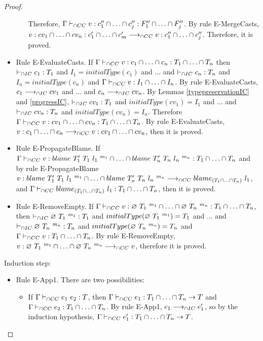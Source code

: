 \documentclass[a4paper]{article}
\begin{document}
\begin{proof}
\begin{itemize}
\begin{itemize}
        Therefore, $\Gamma \vdash_{\cap CC} v : c_1'' \cap \ldots \cap c_j'' : F_1'' \cap \ldots \cap F_j''$.
        By rule E-MergeCasts, $v : cv_1 \cap \ldots \cap cv_n : c_1' \cap \ldots \cap c_m' \longrightarrow_{\cap CC} v : c_1'' \cap \ldots \cap c_j''$.
        Therefore, it is proved.
    \end{itemize}
    \item Rule E-EvaluateCasts.
    If $\Gamma \vdash_{\cap CC} v : c_1 \cap \ldots \cap c_n : T_1 \cap \ldots \cap T_n$ then $\vdash_{\cap IC} c_1 : T_1$ and $I_1 = initialType(c_1)$ and ... and $\vdash_{\cap IC} c_n : T_n$ and $I_n = initialType(c_n)$ and $\Gamma \vdash_{\cap CC} v : I_1 \cap \ldots \cap I_n$.
    By rule E-EvaluateCasts, $c_1 \longrightarrow_{\cap IC} cv_1$ and ... and $c_n \longrightarrow_{\cap IC} cv_n$.
    By Lemmas \ref{typepreservationIC} and \ref{progressIC}, $\vdash_{\cap IC} cv_1 : T_1$ and $initialType(cv_1) = I_1$ and ... and $\vdash_{\cap IC} cv_n : T_n$ and $initialType(cv_n) = I_n$.
    Therefore $\Gamma \vdash_{\cap CC} v : cv_1 \cap \ldots \cap cv_n : T_1 \cap \ldots \cap T_n$.
    By rule E-EvaluateCasts, $v : c_1 \cap \ldots \cap c_n \longrightarrow_{\cap CC} v : cv_1 \cap \ldots \cap cv_n$, then it is proved.
    \item Rule E-PropagateBlame.
    If $\Gamma \vdash_{\cap CC} v : blame\ T_1'\ T_1\ l_1\ ^{m_1} \cap \ldots \cap blame\ T_n'\ T_n\ l_n\ ^{m_n} : T_1 \cap \ldots \cap T_n$ and by rule E-PropagateBlame $v : blame\ T_1'\ T_1\ l_1\ ^{m_1} \cap \ldots \cap blame\ T_n'\ T_n\ l_n\ ^{m_n} \longrightarrow_{\cap CC} blame_{(T_1 \cap \ldots \cap T_n)}\ l_1$, and $\Gamma \vdash_{\cap CC} blame_{(T_1 \cap \ldots \cap T_n)}\ l_1 : T_1 \cap \ldots \cap T_n$, then it is proved.
    \item Rule E-RemoveEmpty.
    If $\Gamma \vdash_{\cap CC} v : \varnothing\ T_1\ ^{m_1} \cap \ldots \cap \varnothing\ T_n\ ^{m_n} : T_1 \cap \ldots \cap T_n$, then $\vdash_{\cap IC} \varnothing\ T_1\ ^{m_1} : T_1$ and $initialType(\varnothing\ T_1\ ^{m_1}) = T_1$ and ... and $\vdash_{\cap IC} \varnothing\ T_n\ ^{m_n} : T_n$ and $initialType(\varnothing\ T_n\ ^{m_n}) = T_n$ and $\Gamma \vdash_{\cap CC} v : T_1 \cap \ldots \cap T_n$.
    By rule E-RemoveEmpty, $v : \varnothing\ T_1\ ^{m_1} \cap \ldots \cap \varnothing\ T_n\ ^{m_n} \longrightarrow_{\cap CC} v$, therefore it is proved.
\end{itemize}
Induction step:
\begin{itemize}
    \item Rule E-App1. There are two possibilities:
    \begin{itemize}
        \item If $\Gamma \vdash_{\cap CC} e_1\ e_2 : T$, then $\Gamma \vdash_{\cap CC} e_1 : T_1 \cap \ldots \cap T_n \rightarrow T$ and $\Gamma \vdash_{\cap CC} e_2 : T_1 \cap \ldots \cap T_n$.
        By rule E-App1, $e_1 \longrightarrow_{\cap IC} e_1'$, so by the induction hypothesis, $\Gamma \vdash_{\cap CC} e_1' : T_1 \cap \ldots \cap T_n \rightarrow T$.

\end{itemize}
\end{itemize}
\end{proof}
\end{document}
